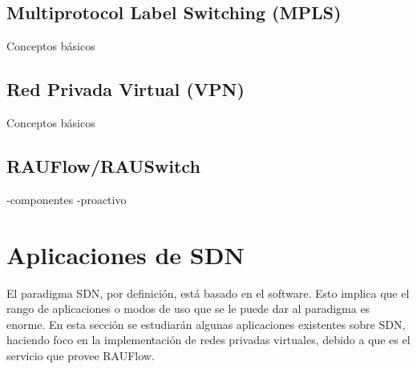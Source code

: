 



\subsection{Multiprotocol Label Switching (MPLS)}
Conceptos básicos

\subsection{Red Privada Virtual (VPN)}
Conceptos básicos

\subsection{RAUFlow/RAUSwitch}

-componentes
-proactivo

\section{Aplicaciones de SDN}
El paradigma SDN, por definición, está basado en el software. Esto implica que el rango de aplicaciones o modos de uso que se le puede dar al paradigma es enorme. En esta sección se estudiarán algunas aplicaciones existentes sobre SDN, haciendo foco en la implementación de redes privadas virtuales, debido a que es el servicio que provee RAUFlow.
